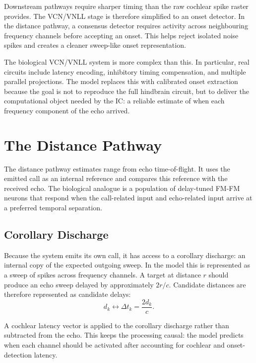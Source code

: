 Downstream pathways require sharper timing than the raw cochlear spike raster provides. The VCN/VNLL stage is therefore simplified to an onset detector. In the distance pathway, a consensus detector requires activity across neighbouring frequency channels before accepting an onset. This helps reject isolated noise spikes and creates a cleaner sweep-like onset representation.

The biological VCN/VNLL system is more complex than this. In particular, real circuits include latency encoding, inhibitory timing compensation, and multiple parallel projections. The model replaces this with calibrated onset extraction because the goal is not to reproduce the full hindbrain circuit, but to deliver the computational object needed by the IC: a reliable estimate of when each frequency component of the echo arrived.

\section{The Distance Pathway}

The distance pathway estimates range from echo time-of-flight. It uses the emitted call as an internal reference and compares this reference with the received echo. The biological analogue is a population of delay-tuned FM-FM neurons that respond when the call-related input and echo-related input arrive at a preferred temporal separation.

\subsection{Corollary Discharge}

Because the system emits its own call, it has access to a corollary discharge: an internal copy of the expected outgoing sweep. In the model this is represented as a sweep of spikes across frequency channels. A target at distance $r$ should produce an echo sweep delayed by approximately $2r/c$. Candidate distances are therefore represented as candidate delays:
\begin{equation}
    d_k \leftrightarrow \Delta t_k = \frac{2d_k}{c}.
\end{equation}

A cochlear latency vector is applied to the corollary discharge rather than subtracted from the echo. This keeps the processing causal: the model predicts when each channel should be activated after accounting for cochlear and onset-detection latency.

